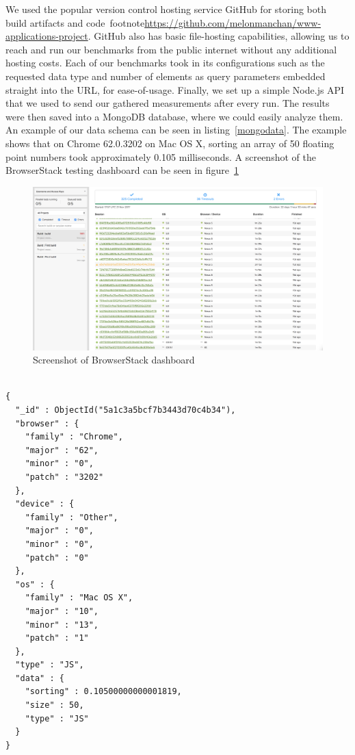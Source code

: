 \documentclass[conference]{IEEEtran}
\begin{document}
We used the popular version control hosting service GitHub for storing both
build artifacts and code~footnote{\url{https://github.com/melonmanchan/www-applications-project}}. GitHub also has basic file-hosting capabilities,
allowing us to reach and run our benchmarks from the public internet without
any additional hosting costs. Each of our benchmarks took in its configurations
such as the requested data type and number of elements as query parameters
embedded straight into the URL, for ease-of-usage. Finally, we set up a simple
Node.js API that we used to send our gathered measurements after every run. The
results were then saved into a MongoDB database, where we could easily analyze
them. An example of our data schema can be seen in listing~\ref{mongodata}. The
example shows that on Chrome 62.0.3202 on Mac OS X, sorting an array of 50
floating point numbers took approximately 0.105 milliseconds. A screenshot of
the BrowserStack testing dashboard can be seen in figure~\ref{stackpic}

\begin{figure}[htbp]
\includegraphics[width=\linewidth,keepaspectratio]{stack.png}
  \caption{Screenshot of BrowserStack dashboard}\label{stackpic}
\end{figure}

\begin{lstlisting}[caption={Measurement data example},label=mongodata, basicstyle=\scriptsize]

{
  "_id" : ObjectId("5a1c3a5bcf7b3443d70c4b34"),
  "browser" : {
    "family" : "Chrome",
    "major" : "62",
    "minor" : "0",
    "patch" : "3202"
  },
  "device" : {
    "family" : "Other",
    "major" : "0",
    "minor" : "0",
    "patch" : "0"
  },
  "os" : {
    "family" : "Mac OS X",
    "major" : "10",
    "minor" : "13",
    "patch" : "1"
  },
  "type" : "JS",
  "data" : {
    "sorting" : 0.10500000000001819,
    "size" : 50,
    "type" : "JS"
  }
}
\end{lstlisting}
\end{document}
